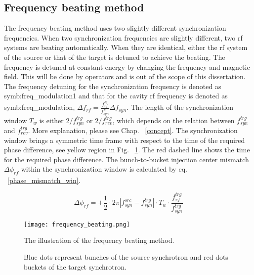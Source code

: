 
\subsection{Frequency beating method}
\label{subsec:beating}

The frequency beating method uses two slightly different synchronization frequencies. When two synchronization frequencies are slightly different, two rf systems are beating automatically. When they are identical, either the rf system of the source or that of the target is detuned to achieve the beating. The frequency is detuned at constant energy by changing the frequency and magnetic field. This will be done by operators and is out of the scope of this dissertation. The frequency detuning for the synchronization frequency is denoted as \gls{symb:freq_modulation1} and that for the cavity rf frequency is denoted as \gls{symb:freq_modulation},  $\Delta f_\mathit{rf}=\frac{f_{\mathit{rf}}^\mathit{X}}{f_{\mathit{syn}}^\mathit{X}} \Delta f_\mathit{syn}$. The length of the synchronization window $T_\mathit{w}$ is either $2/f_{\mathit{syn}}^\mathit{trg}$ or $2/f_{\mathit{rev}}^\mathit{trg}$, which depends on the relation between $f_{\mathit{syn}}^\mathit{trg}$ and $f_{\mathit{rev}}^\mathit{trg}$. More explanation, please see Chap. ~\ref{concept}. The synchronization window brings a symmetric time frame with respect to the time of the required phase difference, see yellow region in Fig. ~\ref{frequency_beat}. The red dashed line shows the time for the required phase difference. The bunch-to-bucket injection center mismatch $\Delta \phi_\mathit{rf}$ within the synchronization window is calculated by eq. ~\ref{phase_mismatch_win}. %

\begin{equation}
\Delta \phi_\mathit{rf}=\pm \frac{1}{2}\cdot 2\pi|f_{\mathit{syn}}^\mathit{src}-f_{\mathit{syn}}^\mathit{trg}|\cdot T_\mathit{w}\cdot \frac{f_{\mathit{rf}}^\mathit{trg}}{f_{\mathit{syn}}^\mathit{trg}}\label{phase_mismatch_win}
\end{equation}
\begin{figure}[!htb]
   \centering   
   \texttt{[image: frequency\_beating.png]}
   \caption{The illustration of the frequency beating method.}
	\caption*{Blue dots represent bunches of the source synchrotron and red dots buckets of the target synchrotron.}
   \label{frequency_beat}
\end{figure}

